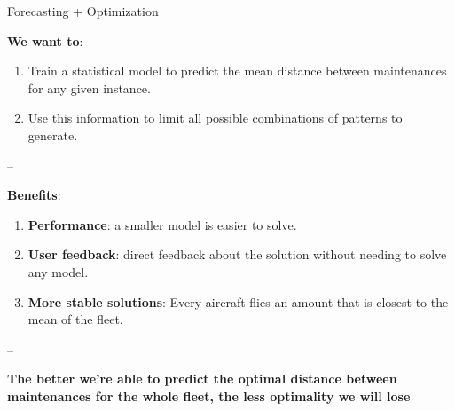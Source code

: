 \begin{frame}

\begin{block}{Forecasting + Optimization}

\textbf{We want to}:

\begin{enumerate}[<+->]

\item
  Train a statistical model to predict the mean distance between
  maintenances for any given instance.
\item
  Use this information to limit all possible combinations of patterns to
  generate.
\end{enumerate}

--

\textbf{Benefits}:

\begin{enumerate}[<+->]

\item
  \textbf{Performance}: a smaller model is easier to solve.
\item
  \textbf{User feedback}: direct feedback about the solution without
  needing to solve any model.
\item
  \textbf{More stable solutions}: Every aircraft flies an amount that is
  closest to the mean of the fleet.
\end{enumerate}

--

\textbf{The better we're able to predict the optimal distance between
maintenances for the whole fleet, the less optimality we will lose}

\end{block}

\end{frame}


